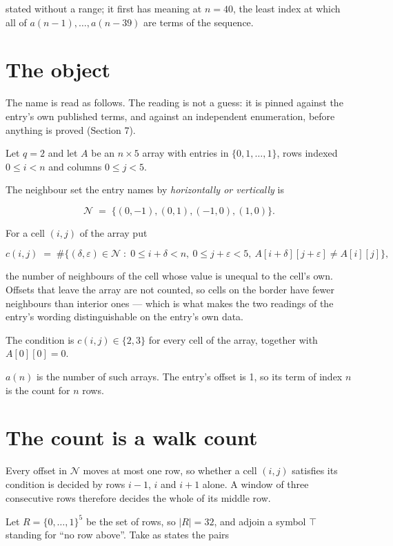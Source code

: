 \documentclass[11pt]{article}
\theoremstyle{definition}
\begin{document}
stated without a range; it first has meaning at $n = 40$, the least index at which all of $a(n-1),\dots,a(n-39)$ are terms of the sequence.

\section{The object}

The name is read as follows. The reading is not a guess: it is pinned against the entry's own published terms, and against an independent enumeration, before anything is proved (Section 7).

Let $q = 2$ and let $A$ be an $n \times 5$ array with entries in $\{0,1,\dots,1\}$, rows indexed $0 \le i < n$ and columns $0 \le j < 5$.

The neighbour set the entry names by {\itshape horizontally or vertically} is

\[\mathcal{N} \;=\; \{(0,-1), (0,1), (-1,0), (1,0)\}.\]

For a cell $(i,j)$ of the array put

\[c(i,j) \;=\; \#\bigl\{(\delta,\varepsilon)\in\mathcal{N} \;:\; 0\le i+\delta<n,\ 0\le j+\varepsilon<5,\ A[i+\delta][j+\varepsilon] \neq A[i][j]\bigr\},\]

the number of neighbours of the cell whose value is unequal to the cell's own. Offsets that leave the array are not counted, so cells on the border have fewer neighbours than interior ones --- which is what makes the two readings of the entry's wording distinguishable on the entry's own data.

The condition is $c(i,j) \in \{2, 3\}$ for every cell of the array, together with $A[0][0]=0$.

$a(n)$ is the number of such arrays. The entry's offset is 1, so its term of index $n$ is the count for $n$ rows.

\section{The count is a walk count}

Every offset in $\mathcal{N}$ moves at most one row, so whether a cell $(i,j)$ satisfies its condition is decided by rows $i-1$, $i$ and $i+1$ alone. A window of three consecutive rows therefore decides the whole of its middle row.

Let $R = \{0,\dots,1\}^{5}$ be the set of rows, so $|R| = 32$, and adjoin a symbol $\top$ standing for ``no row above''. Take as states the pairs
\end{document}
